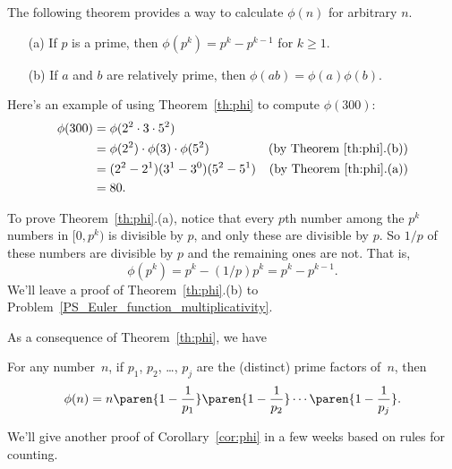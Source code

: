 The following theorem provides a way to calculate $\phi(n)$ for arbitrary $n$.
\begin{theorem}\label{th:phi}\mbox{}
\begin{enumerate}
\item[(a)] If $p$ is a prime, then $\phi(p^k) = p^k - p^{k-1}$ for $k \geq 1$.
\item[(b)] If $a$ and $b$ are relatively prime, then $\phi(ab) = \phi(a)\phi(b)$.
\end{enumerate}
\end{theorem}

Here's an example of using Theorem~\ref{th:phi} to compute $\phi(300)$:
\begin{align*}
\phi(300) & = \phi(2^2 \cdot 3 \cdot 5^2)\\ & = \phi(2^2) \cdot \phi(3) \cdot \phi(5^2) &
\text{(by Theorem~\ref{th:phi}.(b))}\\ & = (2^2 - 2^1) (3^1 - 3^0) (5^2 - 5^1) & \text{(by
  Theorem~\ref{th:phi}.(a))}\\ & = 80.
\end{align*}

To prove Theorem~\ref{th:phi}.(a), notice that every $p$th number among the $p^k$ numbers
in $[0, p^{k})$ is divisible by $p$, and only these are divisible by $p$.  So $1/p$ of
  these numbers are divisible by $p$ and the remaining ones are not.  That is,
\[
\phi(p^{k}) = p^k - (1/p)p^k = p^k -p^{k-1}.
\]
We'll leave a proof of Theorem~\ref{th:phi}.(b) to
Problem~\ref{PS_Euler_function_multiplicativity}.

As a consequence of Theorem~\ref{th:phi}, we have
\begin{corollary}\label{cor:phi}
For any number~$n$, if $p_1$, $p_2$, \dots, $p_j$ are the (distinct) prime factors of~$n$,
then
\begin{equation*}
    \phi(n) = n \paren{1 - \frac{1}{p_1}} \paren{1 - \frac{1}{p_2}} \cdots \paren{1 -
      \frac{1}{p_j}}.
 \end{equation*}
\end{corollary}
We'll give another proof of Corollary~\ref{cor:phi} in a few weeks based on rules for
counting.

\iffalse are all those of the form $mp$.  For $mp$ to be in the interval, $m$ can take any
value from 0 to $p^{k-1}-1$ and no others, so there are exactly $p^{k-1}$ numbers in the
interval that are divisible by $p$.  Now $\phi(p^{k})$ equals the number of remaining
elements in the interval, namely, $p^k -p^{k-1}$.  \fi

